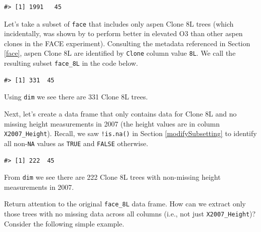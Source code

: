 \documentclass[
  11pt,
]{krantz}
\newenvironment{Shaded}{\begin{snugshade}}{\end{snugshade}}
\newcommand{\KeywordTok}[1]{\textcolor[rgb]{0.13,0.29,0.53}{\textbf{#1}}}
\newcommand{\NormalTok}[1]{#1}
\newcommand{\OperatorTok}[1]{\textcolor[rgb]{0.81,0.36,0.00}{\textbf{#1}}}
\newcommand{\StringTok}[1]{\textcolor[rgb]{0.31,0.60,0.02}{#1}}
\theoremstyle{definition}
\theoremstyle{definition}
\theoremstyle{definition}
\theoremstyle{definition}
\theoremstyle{remark}
\begin{document}
\begin{verbatim}
#> [1] 1991   45
\end{verbatim}

Let's take a subset of \texttt{face} that includes only aspen Clone 8L trees (which incidentally, was shown by \citet{Kubiske07} to perform better in elevated O3 than other aspen clones in the FACE experiment). Consulting the metadata referenced in Section \ref{face}, aspen Clone 8L are identified by \texttt{Clone} column value \texttt{8L}. We call the resulting subset \texttt{face\_8L} in the code below.

\begin{Shaded}
\end{Shaded}

\begin{verbatim}
#> [1] 331  45
\end{verbatim}

Using \texttt{dim} we see there are 331 Clone 8L trees.

Next, let's create a data frame that only contains data for Clone 8L and no missing height measurements in 2007 (the height values are in column \texttt{X2007\_Height}). Recall, we saw \texttt{!is.na()} in Section \ref{modifySubsetting} to identify all non-\texttt{NA} values as \texttt{TRUE} and \texttt{FALSE} otherwise.

\begin{Shaded}
\end{Shaded}

\begin{verbatim}
#> [1] 222  45
\end{verbatim}

From \texttt{dim} we see there are 222 Clone 8L trees with non-missing height measurements in 2007.

Return attention to the original \texttt{face\_8L} data frame. How can we extract only those trees with no missing data across all columns (i.e., not just \texttt{X2007\_Height})? Consider the following simple example.
\end{document}
